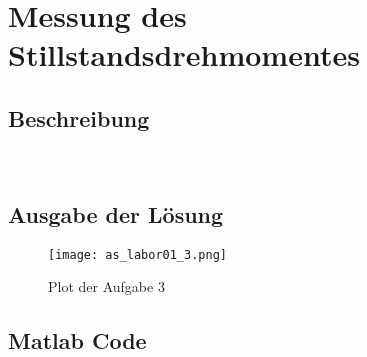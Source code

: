 \section{Messung des Stillstandsdrehmomentes}

\subsection{Beschreibung}
\lipsum[1]\\

\subsection{Ausgabe der Lösung}
\begin{figure}[htp]
 \centering
 \texttt{[image: as\_labor01\_3.png]}
 \caption{Plot der Aufgabe 3}
 \label{fig:PlotAufgabe3}
\end{figure}

\subsection{Matlab Code}

